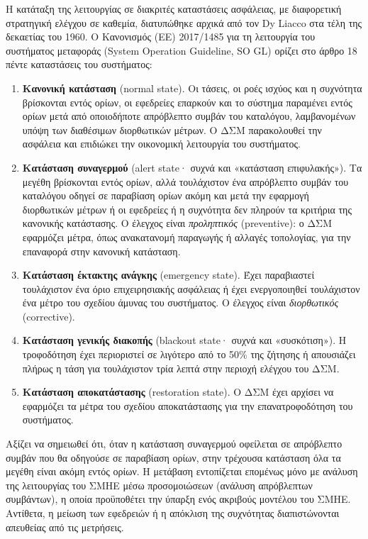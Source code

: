 Η κατάταξη της λειτουργίας σε διακριτές καταστάσεις ασφάλειας, με διαφορετική στρατηγική
ελέγχου σε καθεμία, διατυπώθηκε αρχικά από τον Dy Liacco στα τέλη της δεκαετίας του 1960. Ο
Κανονισμός (ΕΕ) 2017/1485 για τη λειτουργία του συστήματος μεταφοράς (System Operation
Guideline, SO GL) ορίζει στο άρθρο 18 πέντε καταστάσεις του συστήματος:

\begin{enumerate}
\item \textbf{Κανονική κατάσταση} (normal state). Οι τάσεις, οι ροές ισχύος και η συχνότητα
      βρίσκονται εντός ορίων, οι εφεδρείες επαρκούν και το σύστημα παραμένει εντός ορίων μετά
      από οποιοδήποτε απρόβλεπτο συμβάν του καταλόγου, λαμβανομένων
      υπόψη των διαθέσιμων διορθωτικών μέτρων. Ο ΔΣΜ παρακολουθεί την ασφάλεια και επιδιώκει την
      οικονομική λειτουργία του συστήματος.
\item \textbf{Κατάσταση συναγερμού} (alert state· συχνά και «κατάσταση επιφυλακής»). Τα
      μεγέθη βρίσκονται εντός ορίων, αλλά τουλάχιστον ένα απρόβλεπτο συμβάν του καταλόγου
      οδηγεί σε παραβίαση ορίων ακόμη και μετά την εφαρμογή διορθωτικών μέτρων ή οι εφεδρείες
      ή η συχνότητα δεν πληρούν τα κριτήρια της κανονικής κατάστασης. Ο έλεγχος είναι
      \emph{προληπτικός} (preventive): ο ΔΣΜ εφαρμόζει μέτρα, όπως ανακατανομή παραγωγής ή
      αλλαγές τοπολογίας, για την επαναφορά στην κανονική κατάσταση.
\item \textbf{Κατάσταση έκτακτης ανάγκης} (emergency state). Έχει παραβιαστεί τουλάχιστον
      ένα όριο επιχειρησιακής ασφάλειας ή έχει ενεργοποιηθεί τουλάχιστον ένα μέτρο του
      σχεδίου άμυνας του συστήματος. Ο έλεγχος είναι \emph{διορθωτικός} (corrective).
\item \textbf{Κατάσταση γενικής διακοπής} (blackout state· συχνά και «συσκότιση»). Η τροφοδότηση έχει περιοριστεί σε λιγότερο από το 50\% της ζήτησης ή απουσιάζει πλήρως η τάση για
      τουλάχιστον τρία λεπτά στην περιοχή ελέγχου του ΔΣΜ.
\item \textbf{Κατάσταση αποκατάστασης} (restoration state). Ο ΔΣΜ έχει αρχίσει να
      εφαρμόζει τα μέτρα του σχεδίου αποκατάστασης για την επανατροφοδότηση του
      συστήματος.
\end{enumerate}

Αξίζει να σημειωθεί ότι, όταν η κατάσταση συναγερμού οφείλεται σε απρόβλεπτο συμβάν που θα
οδηγούσε σε παραβίαση ορίων, στην τρέχουσα κατάσταση όλα τα μεγέθη είναι ακόμη εντός ορίων. Η
μετάβαση εντοπίζεται επομένως μόνο με ανάλυση της λειτουργίας του ΣΜΗΕ μέσω προσομοιώσεων
(ανάλυση απρόβλεπτων συμβάντων), η οποία προϋποθέτει την ύπαρξη ενός ακριβούς μοντέλου του ΣΜΗΕ. Αντίθετα, η μείωση των εφεδρειών ή η απόκλιση της
συχνότητας διαπιστώνονται απευθείας από τις μετρήσεις.

